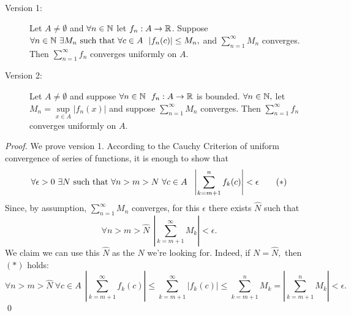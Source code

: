 \begin{theorem} \leavevmode \\
    \begin{description}
        \item[Version 1: ] Let $A \neq \emptyset$ and $\forall n \in \mathbb{N}$ let $f_n: A \to \mathbb{R}$. Suppose $\forall n \in \mathbb{N} ~\exists M_n \text{ such that } \forall c \in A ~~|f_n(c)| \leq M_n,$ and $\sum \limits_{n=1}^\infty M_n$ converges. Then $\sum \limits_{n=1}^\infty f_n$ converges uniformly on $A$.
        
        \item[Version 2: ] Let $A \neq \emptyset$ and suppose $\forall n \in \mathbb{N} ~~f_n:A \to \mathbb{R}$ is bounded. $\forall n \in \mathbb{N},$ let $M_n = \underset{x \in A}{\sup}|f_n(x)|$ and suppose $\sum \limits_{n=1}^\infty M_n$ converges. Then $\sum \limits_{n=1}^\infty f_n$ converges uniformly on $A$.
    \end{description}
\end{theorem}

\begin{proof}
    We prove version 1. According to the Cauchy Criterion of uniform convergence of series of functions, it is enough to show that
    \[\forall \epsilon > 0 ~\exists N \text{ such that } \forall n > m > N ~\forall c \in A ~~\left|\sum_{k=m+1}^n f_k(c)\right| < \epsilon \tag{$*$}\]
    Since, by assumption, $\sum \limits_{n=1}^\infty M_n$ converges, for this $\epsilon$ there exists $\hat{N}$ such that
    \[\forall n > m > \hat{N} ~~\left|\sum_{k=m+1}^\infty M_k\right|< \epsilon.\]
    We claim we can use this $\hat{N}$ as the $N$ we're looking for. Indeed, if $N = \hat{N},$ then $(*)$ holds:
    \[\forall n > m > \hat{N} ~\forall c \in A ~~\left|\sum_{k=m+1}^\infty f_k(c)\right| \leq \sum_{k=m+1}^\infty |f_k(c)| \leq \sum_{k=m+1}^n M_k = \left|\sum_{k=m+1}^{n}M_k\right|< \epsilon.\]
    \qed
\end{proof}

